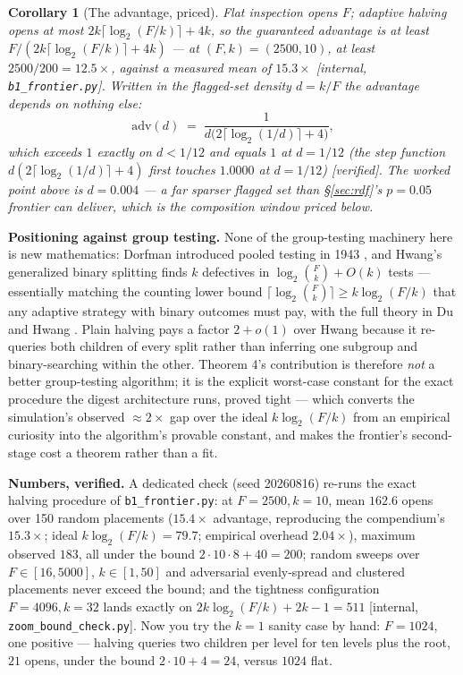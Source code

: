 \documentclass[11pt,a4paper]{article}
\newtheorem{corollary}{Corollary}
\begin{document}
\begin{corollary}[The advantage, priced]\label{cor:zoom-advantage}
Flat inspection opens $F$; adaptive halving opens at most $2k\lceil\log_2(F/k)\rceil+4k$, so the guaranteed advantage is at least $F/(2k\lceil\log_2(F/k)\rceil+4k)$ --- at $(F,k)=(2500,10)$, at least $2500/200=12.5\times$, against a measured mean of $15.3\times$ [internal, \texttt{b1\_frontier.py}]. Written in the flagged-set density $d=k/F$ the advantage depends on nothing else:
\[
\mathrm{adv}(d)\;=\;\frac{1}{d\bigl(2\lceil\log_2(1/d)\rceil+4\bigr)},
\]
which exceeds $1$ exactly on $d<1/12$ and equals $1$ at $d=1/12$ (the step function $d(2\lceil\log_2(1/d)\rceil+4)$ first touches $1.0000$ at $d=1/12$) [verified]. The worked point above is $d{=}0.004$ --- a far sparser flagged set than \S\ref{sec:rdf}'s $p{=}0.05$ frontier can deliver, which is the composition window priced below.
\end{corollary}

\textbf{Positioning against group testing.} None of the group-testing machinery here is new mathematics: Dorfman introduced pooled testing in 1943 \cite{dorfman}, and Hwang's generalized binary splitting \cite{hwang} finds $k$ defectives in $\log_2\binom{F}{k}+O(k)$ tests --- essentially matching the counting lower bound $\lceil\log_2\binom{F}{k}\rceil\ge k\log_2(F/k)$ that any adaptive strategy with binary outcomes must pay, with the full theory in Du and Hwang \cite{duhwang}. Plain halving pays a factor $2+o(1)$ over Hwang because it re-queries both children of every split rather than inferring one subgroup and binary-searching within the other. Theorem 4's contribution is therefore \emph{not} a better group-testing algorithm; it is the explicit worst-case constant for the exact procedure the digest architecture runs, proved tight --- which converts the simulation's observed $\approx 2\times$ gap over the ideal $k\log_2(F/k)$ from an empirical curiosity into the algorithm's provable constant, and makes the frontier's second-stage cost a theorem rather than a fit.

\textbf{Numbers, verified.} A dedicated check (seed 20260816) re-runs the exact halving procedure of \texttt{b1\_frontier.py}: at $F{=}2500,k{=}10$, mean $162.6$ opens over 150 random placements ($15.4\times$ advantage, reproducing the compendium's $15.3\times$; ideal $k\log_2(F/k)=79.7$; empirical overhead $2.04\times$), maximum observed $183$, all under the bound $2\cdot10\cdot8+40=200$; random sweeps over $F\in[16,5000]$, $k\in[1,50]$ and adversarial evenly-spread and clustered placements never exceed the bound; and the tightness configuration $F{=}4096,k{=}32$ lands exactly on $2k\log_2(F/k)+2k-1=511$ [internal, \texttt{zoom\_bound\_check.py}]. Now you try the $k=1$ sanity case by hand: $F=1024$, one positive --- halving queries two children per level for ten levels plus the root, $21$ opens, under the bound $2\cdot10+4=24$, versus $1024$ flat.
\end{document}

